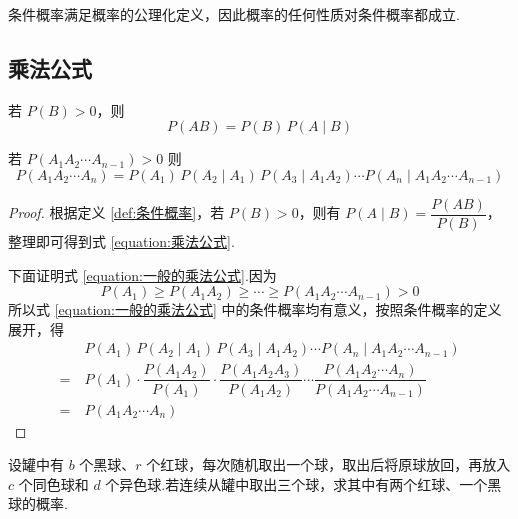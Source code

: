 \begin{note}
    \indent 条件概率满足概率的公理化定义，因此概率的任何性质对条件概率都成立.
\end{note}

\subsection{乘法公式}

\begin{theorem}[][乘法公式]
    \indent 若 $P(B)>0$，则
    \begin{equation} \label{equation:乘法公式}
        P(AB) = P(B) \, P(A \mid B)    
    \end{equation}
    
    若 $P(A_1 A_2 \cdots A_{n-1}) > 0$ 则
    \begin{equation} \label{equation:一般的乘法公式}
        P(A_1 A_2 \cdots A_n) = P(A_1) \, P(A_2 \mid A_1) \, P(A_3 \mid A_1 A_2) \cdots P(A_n \mid A_1 A_2 \cdots A_{n-1})
    \end{equation}
\end{theorem}

\begin{proof}
    根据定义 \ref{def:条件概率}，若 $P(B)>0$，则有 $P(A \mid B) = \dfrac{P(AB)}{P(B)}$，整理即可得到式 \eqref{equation:乘法公式}.

    下面证明式 \eqref{equation:一般的乘法公式}.因为
    $$
    P(A_1) \geqslant P(A_1 A_2) \geqslant \cdots \geqslant P(A_1 A_2 \cdots A_{n-1}) > 0
    $$
    所以式 \eqref{equation:一般的乘法公式} 中的条件概率均有意义，按照条件概率的定义展开，得
    $$
    \begin{aligned}
        & P(A_1) \, P(A_2 \mid A_1) \, P(A_3 \mid A_1 A_2) \cdots P(A_n \mid A_1 A_2 \cdots A_{n-1}) \\
        =\ & P(A_1) \cdot \dfrac{P(A_1 A_2)}{P(A_1)} \cdot \dfrac{P(A_1 A_2 A_3)}{P(A_1 A_2)} \cdots \dfrac{P(A_1 A_2 \cdots A_n)}{P(A_1 A_2 \cdots A_{n-1})} \\
        =\ & P(A_1 A_2 \cdots A_n)
    \end{aligned}
    $$

    \vspace{-2em}
\end{proof}

\begin{example}[][波利亚罐子模型]
    \indent 设罐中有 $b$ 个黑球、$r$ 个红球，每次随机取出一个球，取出后将原球放回，再放入 $c$ 个同色球和 $d$ 个异色球.若连续从罐中取出三个球，求其中有两个红球、一个黑球的概率.
\end{example}

